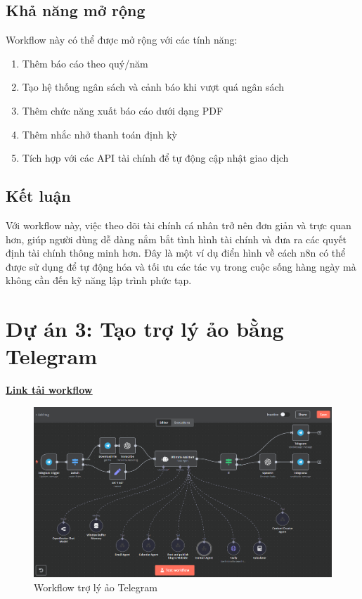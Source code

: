 \subsection{Khả năng mở rộng}

Workflow này có thể được mở rộng với các tính năng:
\begin{enumerate}
    \item Thêm báo cáo theo quý/năm
    \item Tạo hệ thống ngân sách và cảnh báo khi vượt quá ngân sách
    \item Thêm chức năng xuất báo cáo dưới dạng PDF
    \item Thêm nhắc nhở thanh toán định kỳ
    \item Tích hợp với các API tài chính để tự động cập nhật giao dịch
\end{enumerate}

\subsection{Kết luận}

Với workflow này, việc theo dõi tài chính cá nhân trở nên đơn giản và trực quan hơn, giúp người dùng dễ dàng nắm bắt tình hình tài chính và đưa ra các quyết định tài chính thông minh hơn. Đây là một ví dụ điển hình về cách n8n có thể được sử dụng để tự động hóa và tối ưu các tác vụ trong cuộc sống hàng ngày mà không cần đến kỹ năng lập trình phức tạp.

\clearpage
\section{\textbf{Dự án 3: Tạo trợ lý ảo bằng Telegram }}

\href{https://drive.google.com/drive/folders/1-qVA3yQnfIx70DsZKdPAGYQcr8WftkGJ?usp=sharing}{\textbf{\underline {Link tải workflow}}}

    \begin{figure}[H]
    \centering
    \includegraphics[width=1\textwidth]{images/4chatbot01.png}
    \caption{Workflow trợ lý ảo Telegram}
    \end{figure}


